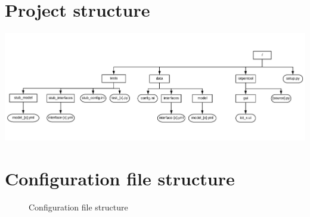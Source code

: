 \documentclass{article}
\begin{document}
\section{Project structure}\label{sec:appendix-proj-struct}

\begin{center}
	\begin{sideways}%
		\begin{minipage}{0.92\textheight}
			\includegraphics[width=\linewidth,keepaspectratio]{project_layout}
			\label{fig:xx}
		\end{minipage}
	\end{sideways}
\end{center}

\section{Configuration file structure}\label{sec:appendix-config-struct}
\begin{figure}[!htb]
	\caption{\label{fig:config-struct} Configuration file structure}
\end{figure}


\end{document}
